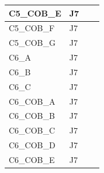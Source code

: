 \begin{longtable}{|l|l|l|l|}
C5\_COB\_E                       & J7                                                &                                                  &                                                  \\ \hline
C5\_COB\_F                       & J7                                                &                                                  &                                                  \\ \hline
C5\_COB\_G                       & J7                                                &                                                  &                                                  \\ \hline
C6\_A                           & J7                                                &                                                  &                                                  \\ \hline
C6\_B                           & J7                                                &                                                  &                                                  \\ \hline
C6\_C                           & J7                                                &                                                  &                                                  \\ \hline
C6\_COB\_A                       & J7                                                &                                                  &                                                  \\ \hline
C6\_COB\_B                       & J7                                                &                                                  &                                                  \\ \hline
C6\_COB\_C                       & J7                                                &                                                  &                                                  \\ \hline
C6\_COB\_D                       & J7                                                &                                                  &                                                  \\ \hline
C6\_COB\_E                       & J7                                                &                                                  &                                                  \\ \hline

\end{longtable}
